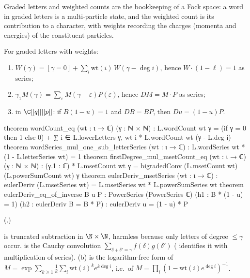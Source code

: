 \begin{physics}
Graded letters and weighted counts are the bookkeeping of a Fock space: a word in graded letters is a multi-particle
state, and the weighted count is its contribution to a character, with weights recording the charges (momenta and
energies) of the constituent particles.
\end{physics}

\begin{theorem}\label{ch19:thm:characters}
For graded letters with weights:
\begin{enumerate}[label=(\alph*)]
\item $W(\gamma)=[\gamma=0]+\sum_i\mathrm{wt}(i)\,W(\gamma-\deg i)$, hence $W\cdot(1-\ell)=1$ as series;
\item $\gamma_1M(\gamma)=\sum_\varepsilon M(\gamma-\varepsilon)P(\varepsilon)$, hence $DM=M\cdot P$ as series;
\item in $\C[[q]][[p]]$: if $B(1-u)=1$ and $DB=BP$, then $Du=(1-u)P$.
\end{enumerate}
\end{theorem}
\begin{leancode}
theorem wordCount_eq (wt : ι → ℂ) (γ : ℕ × ℕ) :
    L.wordCount wt γ = (if γ = 0 then 1 else 0) +
      ∑ i ∈ L.lowerLetters γ, wt i * L.wordCount wt (γ - L.deg i)
theorem wordSeries_mul_one_sub_letterSeries (wt : ι → ℂ) :
    L.wordSeries wt * (1 - L.letterSeries wt) = 1
theorem firstDegree_mul_msetCount_eq (wt : ι → ℂ) (γ : ℕ × ℕ) :
    (γ.1 : ℂ) * L.msetCount wt γ = bigradedConv (L.msetCount wt) (L.powerSumCount wt) γ
theorem eulerDeriv_msetSeries (wt : ι → ℂ) :
    eulerDeriv (L.msetSeries wt) = L.msetSeries wt * L.powerSumSeries wt
theorem eulerDeriv_eq_of_inverse {B u P : PowerSeries (PowerSeries ℂ)} (h1 : B * (1 - u) = 1)
    (h2 : eulerDeriv B = B * P) : eulerDeriv u = (1 - u) * P
\end{leancode}
(.)
\begin{dictionary}
 is truncated subtraction in $\N\times\N$, harmless because only letters of degree $\le\gamma$ occur.
 is the Cauchy convolution $\sum_{\delta+\delta'=\gamma}f(\delta)g(\delta')$ (
identifies it with multiplication of series).  (b) is the logarithm-free form of
$M=\exp\sum_{k\ge1}\frac1k\sum_i\mathrm{wt}(i)^ke^{k\deg i}$, i.e.\ of $M=\prod_i(1-\mathrm{wt}(i)e^{\deg i})^{-1}$.
\end{dictionary}
